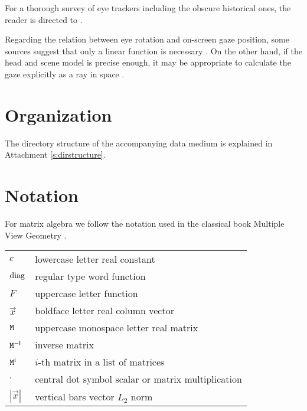 
For a thorough survey of eye trackers including the obscure historical ones, the reader is directed to \cite{hansen10}.

Regarding the relation between eye rotation and on-screen gaze position, some sources suggest that only a linear function is necessary \cite{zhu12}.
On the other hand, if the head and scene model is precise enough, it may be appropriate to calculate the gaze explicitly as a ray in space \cite{wang16}.

\section{Organization}

The directory structure of the accompanying data medium is explained in Attachment \ref{s:dirstructure}.

\section{Notation}

For matrix algebra we follow the notation used in the classical book Multiple View Geometry \cite{hartley03}.

\begin{table}[h!]
\centering
\begin{tabularx}{\textwidth}{lX}
$c$ & lowercase letter \dotfill real constant \\
$\mathrm{diag}$ & regular type word \dotfill function \\
$F$ & uppercase letter \dotfill function \\
$\vec x$ & boldface letter \dotfill real column vector \\
$\mathtt{M}$ & uppercase monospace letter \dotfill real matrix \\
$\mathtt{M}^{-\mathsf{I}}$ & \dotfill inverse matrix \\
$\mathtt{M}^i$ & \dotfill $i$-th matrix in a list of matrices \\
$\cdot$ & central dot symbol \dotfill scalar or matrix multiplication \\
$|\vec x|$ & vertical bars \dotfill vector $L_2$ norm \\
\end{tabularx}
\end{table}
